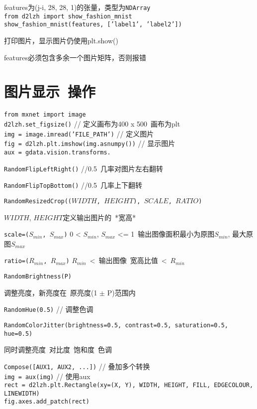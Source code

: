 \documentclass[UTF8]{ctexart}
\begin{document}
  features为(j-i, 28, 28, 1)的张量，类型为\texttt{NDArray}\\
\texttt{from d2lzh import show\_fashion\_mnist}\\
\texttt{show\_fashion\_mnist(features, ['label1', 'label2'])}

  打印图片，显示图片仍使用plt.show()

  features必须包含多余一个图片矩阵，否则报错

\section{图片显示\ 操作}
\noindent \texttt{from mxnet import image}\\
\texttt{d2lzh.set\_figsize()} // 定义画布为400 x 500\ 画布为plt\\
\texttt{img = image.imread('FILE\_PATH')} // 定义图片\\
\texttt{fig = d2lzh.plt.imshow(img.asnumpy())} // 显示图片\\
\texttt{aux = gdata.vision.transforms.}

  \texttt{RandomFlipLeftRight()} //0.5\ 几率对图片左右翻转

  \texttt{RandomFlipTopBottom()} //0.5\ 几率上下翻转

  \texttt{RandomResizedCrop(($WIDTH$, $HEIGHT$), $SCALE$, $RATIO$)}

  \quad $WIDTH$, $HEIGHT$定义输出图片的\ *宽高*
    
  \quad \texttt{scale=($S_{min}$, $S_{max}$)} 0 < $S_{min}$, $S_{max}$ <= 1\ 输出图像面积最小为原图$S_{min}$, 最大原图$S_{max}$ 
    
  \quad \texttt{ratio=($R_{min}$, $R_{max}$)} $R_{min}$\ <\ 输出图像\ 宽高比值\ <\ $R_{min}$
  
  \texttt{RandomBrightness(P)} 

  \quad 调整亮度，新亮度在\ 原亮度(1 $\pm$ P)范围内

  \texttt{RandomHue(0.5)} // 调整色调

  \texttt{RandomColorJitter(brightness=0.5, contrast=0.5, saturation=0.5, hue=0.5)}

  \quad 同时调整亮度\ 对比度\ 饱和度\ 色调
  
  \texttt{Compose([AUX1, AUX2, ...])} // 叠加多个转换\\
\texttt{img = aux(img)} // 使用aux\\
\texttt{rect = d2lzh.plt.Rectangle(xy=(X, Y), WIDTH, HEIGHT, FILL, EDGECOLOUR, LINEWIDTH)}\\
\texttt{fig.axes.add\_patch(rect)}
  
\end{document}
